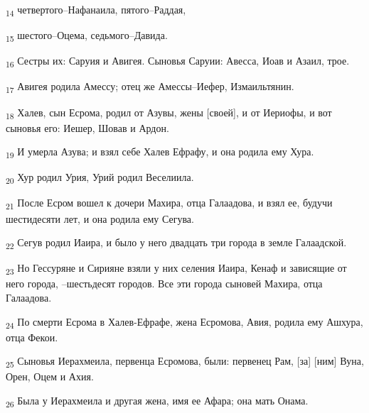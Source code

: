 \begin{tcolorbox}
\textsubscript{14} четвертого--Нафанаила, пятого--Раддая,
\end{tcolorbox}
\begin{tcolorbox}
\textsubscript{15} шестого--Оцема, седьмого--Давида.
\end{tcolorbox}
\begin{tcolorbox}
\textsubscript{16} Сестры их: Саруия и Авигея. Сыновья Саруии: Авесса, Иоав и Азаил, трое.
\end{tcolorbox}
\begin{tcolorbox}
\textsubscript{17} Авигея родила Амессу; отец же Амессы--Иефер, Измаильтянин.
\end{tcolorbox}
\begin{tcolorbox}
\textsubscript{18} Халев, сын Есрома, родил от Азувы, жены [своей], и от Иериофы, и вот сыновья его: Иешер, Шовав и Ардон.
\end{tcolorbox}
\begin{tcolorbox}
\textsubscript{19} И умерла Азува; и взял себе Халев Ефрафу, и она родила ему Хура.
\end{tcolorbox}
\begin{tcolorbox}
\textsubscript{20} Хур родил Урия, Урий родил Веселиила.
\end{tcolorbox}
\begin{tcolorbox}
\textsubscript{21} После Есром вошел к дочери Махира, отца Галаадова, и взял ее, будучи шестидесяти лет, и она родила ему Сегува.
\end{tcolorbox}
\begin{tcolorbox}
\textsubscript{22} Сегув родил Иаира, и было у него двадцать три города в земле Галаадской.
\end{tcolorbox}
\begin{tcolorbox}
\textsubscript{23} Но Гессуряне и Сирияне взяли у них селения Иаира, Кенаф и зависящие от него города, --шестьдесят городов. Все эти города сыновей Махира, отца Галаадова.
\end{tcolorbox}
\begin{tcolorbox}
\textsubscript{24} По смерти Есрома в Халев-Ефрафе, жена Есромова, Авия, родила ему Ашхура, отца Фекои.
\end{tcolorbox}
\begin{tcolorbox}
\textsubscript{25} Сыновья Иерахмеила, первенца Есромова, были: первенец Рам, [за] [ним] Вуна, Орен, Оцем и Ахия.
\end{tcolorbox}
\begin{tcolorbox}
\textsubscript{26} Была у Иерахмеила и другая жена, имя ее Афара; она мать Онама.
\end{tcolorbox}
